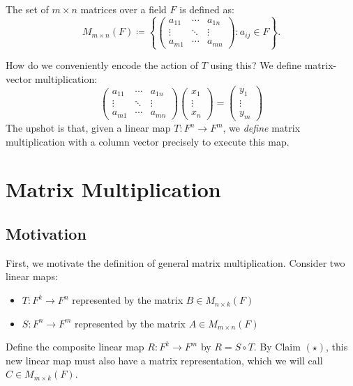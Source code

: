 \documentclass[../linear_algebra_and_groups.tex]{subfiles}
\begin{document}
\begin{definition}[Matrix]
    \begin{shaded*}
        The set of $m \times n$ matrices over a field $F$ is defined as:
        $$M_{m\times n}(F)\coloneqq\left\{\begin{pmatrix}a_{11} & \cdots & a_{1n}\\\vdots & \ddots & \vdots \\ a_{m1} & \cdots & a_{mn}\end{pmatrix}: a_{ij}\in F\right\}.$$
    \end{shaded*}
\end{definition}

How do we conveniently encode the action of $T$ using this? We define matrix-vector multiplication:
$$\begin{pmatrix}a_{11} & \cdots & a_{1n}\\\vdots & \ddots & \vdots \\ a_{m1} & \cdots & a_{mn}\end{pmatrix}\begin{pmatrix}x_1\\\vdots\\x_n\end{pmatrix}=\begin{pmatrix}y_1\\\vdots\\y_m\end{pmatrix}$$
The upshot is that, given a linear map $T:F^n\to F^m$, we \textit{define} matrix multiplication with a column vector precisely to execute this map.

\section{Matrix Multiplication}

\subsection{Motivation}

First, we motivate the definition of general matrix multiplication. Consider two linear maps:
\begin{itemize}
    \item $T:F^k\to F^n$ represented by the matrix $B \in M_{n\times k}(F)$
    \item $S:F^n\to F^m$ represented by the matrix $A \in M_{m\times n}(F)$
\end{itemize}

Define the composite linear map $R:F^k\to F^m$ by $R=S\circ T$. By Claim $(\star)$, this new linear map must also have a matrix representation, which we will call $C \in M_{m\times k}(F)$. 
\end{document}
